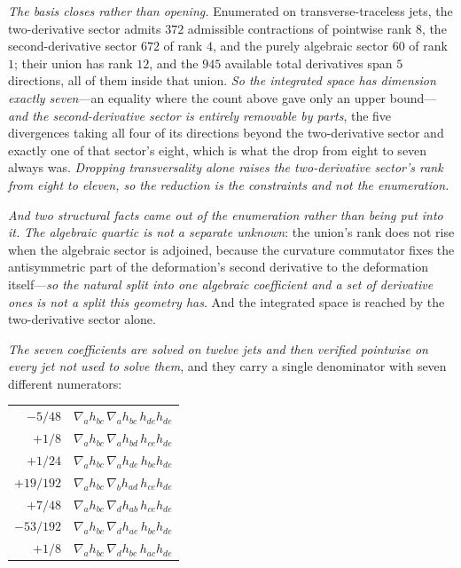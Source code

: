 \documentclass[11pt,a4paper]{article}
\theoremstyle{plain}
\theoremstyle{definition}
\theoremstyle{remark}
\begin{document}
\emph{The basis closes rather than opening.} Enumerated on transverse-traceless jets, the two-derivative sector
admits $372$ admissible contractions of pointwise rank $8$, the second-derivative sector $672$ of rank $4$, and
the purely algebraic sector $60$ of rank $1$; their union has rank $12$, and the $945$ available total
derivatives span $5$ directions, all of them inside that union. \emph{So the integrated space has dimension
exactly seven}---an equality where the count above gave only an upper bound---\emph{and the second-derivative
sector is entirely removable by parts}, the five divergences taking all four of its directions beyond the
two-derivative sector and exactly one of that sector's eight, which is what the drop from eight to seven always
was. \emph{Dropping transversality alone raises the two-derivative sector's rank from eight to eleven, so the
reduction is the constraints and not the enumeration.}

\emph{And two structural facts came out of the enumeration rather than being put into it.} \emph{The algebraic
quartic is not a separate unknown}: the union's rank does not rise when the algebraic sector is adjoined,
because the curvature commutator fixes the antisymmetric part of the deformation's second derivative to the
deformation itself---\emph{so the natural split into one algebraic coefficient and a set of derivative ones is
not a split this geometry has}. And the integrated space is reached by the two-derivative sector alone.

\emph{The seven coefficients are solved on twelve jets and then verified pointwise on every jet not used to
solve them}, and they carry a single denominator with seven different numerators:

\begin{center}
\begin{tabular}{rl}
$-5/48$ & $\nabla_a h_{bc}\,\nabla_a h_{bc}\,h_{de}h_{de}$ \\
$+1/8$ & $\nabla_a h_{bc}\,\nabla_a h_{bd}\,h_{ce}h_{de}$ \\
$+1/24$ & $\nabla_a h_{bc}\,\nabla_a h_{de}\,h_{bc}h_{de}$ \\
$+19/192$ & $\nabla_a h_{bc}\,\nabla_b h_{ad}\,h_{ce}h_{de}$ \\
$+7/48$ & $\nabla_a h_{bc}\,\nabla_d h_{ab}\,h_{ce}h_{de}$ \\
$-53/192$ & $\nabla_a h_{bc}\,\nabla_d h_{ae}\,h_{bc}h_{de}$ \\
$+1/8$ & $\nabla_a h_{bc}\,\nabla_d h_{be}\,h_{ac}h_{de}$ \\
\end{tabular}
\end{center}
\end{document}
